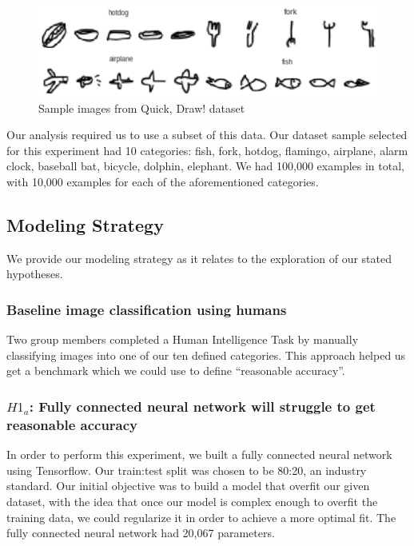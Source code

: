 \documentclass[11pt]{article}
\begin{document}
\begin{figure}[h]
  \begin{center}
    \includegraphics[scale=0.5]{fig1}
  \end{center}
  \caption{Sample images from Quick, Draw! dataset}
  \label{fig:quickImages}
\end{figure}

Our analysis required us to use a subset of this data. Our dataset sample
selected for this experiment had 10 categories: fish, fork, hotdog, flamingo,
airplane, alarm clock, baseball bat, bicycle, dolphin, elephant. We had
100,000 examples in total, with 10,000 examples for each of the aforementioned
categories.

\subsection{Modeling Strategy}

We provide our modeling strategy as it relates to the exploration of
our stated hypotheses.

\subsubsection{Baseline image classification using humans}

Two group members completed a Human Intelligence Task by manually
classifying images into one of our ten defined categories. This
approach helped us get a benchmark which we could use to
define ``reasonable accuracy''. 

\subsubsection{$H1_a$: Fully connected neural network will struggle
  to get reasonable accuracy}

In order to perform this experiment, we built a fully connected neural network
using Tensorflow. Our train:test split was chosen to be 80:20, an industry
standard. Our initial objective was to build a model that overfit our given
dataset, with the idea that once our model is complex enough to overfit the
training data, we could regularize it in order to achieve a more optimal fit.
The fully connected neural network had 20,067 parameters.
\end{document}

